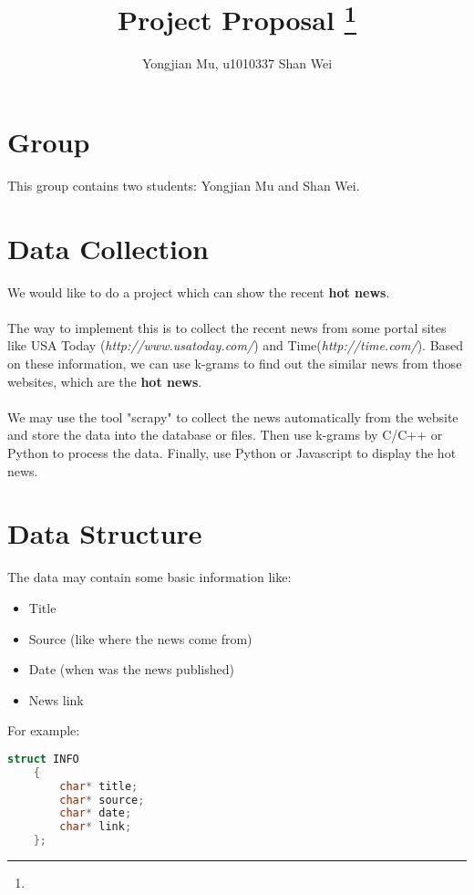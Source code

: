 \documentclass[11pt]{article}
\title{Project Proposal
\footnote{\s{CS 6140; \;\; Spring 2016 \hfill
Instructor: Jeff M. Phillips, University of Utah}
}
}
\author{Yongjian Mu, u1010337 \qquad Shan Wei}
\begin{document}
\maketitle





\section{Group}
This group contains two students: Yongjian Mu and Shan Wei.

\section{Data Collection}
We would like to do a project which can show the recent \textbf{hot news}.\\
\\
The way to implement this is to collect the recent news from some portal sites like USA Today (\textit{http://www.usatoday.com/}) and Time(\textit{http://time.com/}). Based on these information, we can use k-grams to find out the similar news from those websites, which are the \textbf{hot news}.\\
\\
We may use the tool "scrapy" to collect the news automatically from the website and store the data into the database or files. Then use k-grams by C/C++ or Python to process the data. Finally, use Python or Javascript to display the hot news.

\section{Data Structure}
The data may contain some basic information like:
\begin{itemize}
\item Title
\item Source (like where the news come from)
\item Date (when was the news published)
\item News link
\end{itemize}

For example:
\begin{lstlisting}[language=C]
    struct INFO
    {
	    char* title;
	    char* source;
	    char* date;
	    char* link;
    };
\end{lstlisting}
\end{document}
